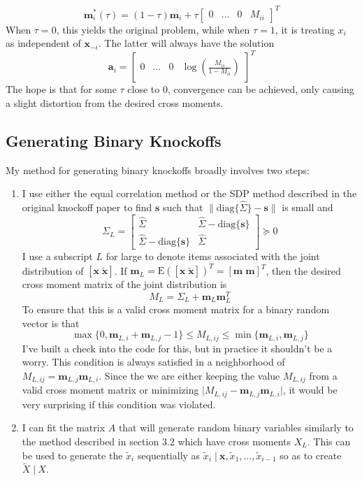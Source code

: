 \documentclass[11pt]{article}
\newcommand{\E}{\mathrm{E}}
\newcommand{\diag}[1]{\mathrm{diag}\{#1\}}
\newcommand{\st}{ \; \big | \:}
\theoremstyle{definition}
\begin{document}
\begin{enumerate}
    \[\mathbf m_i^*(\tau) = (1-\tau)\mathbf m_i + \tau \left[ \begin{array}{cccc} 0 & \ldots & 0 & M_{ii} \end{array} \right]^T \]
            When $\tau=0$, this yields the original problem, while when $\tau=1$, it is treating $x_i$ as independent of $\mathbf x_{-i}$. The latter will always have the solution
            \[\mathbf a_i = \left[ \begin{array}{cccc} 0 & \ldots & 0 & \log\left(\frac{M_{ii}}{1-M_{ii}}\right) \end{array} \right]^T \]
            The hope is that for some $\tau$ close to $0$, convergence can be achieved, only causing a slight distortion from the desired cross moments.
    \end{enumerate}

\subsection{Generating Binary Knockoffs}
    My method for generating binary knockoffs broadly involves two steps:
    \begin{enumerate}
        \item I use either the equal correlation method or the SDP method described in the original knockoff paper to find $\mathbf s$ such that $\|\diag{\hat\Sigma}-\mathbf s\|$ is small and 
        \[ \Sigma_L = \left[\begin{array}{cc}  \hat\Sigma & \hat\Sigma - \diag{\mathbf s }\\ \hat\Sigma - \diag{\mathbf s} & \hat\Sigma \end{array}\right] \succeq 0 \]
        I use a subscript $L$ for large to denote items associated with the joint distribution of $[\mathbf x \; \mathbf{\tilde x}]$. If $\mathbf m_L = \E\left([\mathbf x \; \mathbf{\tilde x}]\right)^T = [\mathbf m \; \mathbf m]^T$, then the desired cross moment matrix of the joint distribution is 
        \[ M_L = \Sigma_L + \mathbf m_L\mathbf m_L^T\]
        To ensure that this is a valid cross moment matrix for a binary random vector is that 
        \[\max\{0,\mathbf m_{L,i} + \mathbf m_{L,j} -1\} \leq M_{L,ij} \leq \min\{\mathbf m_{L,i}, \mathbf m_{L,j}\} \]
        I've built a check into the code for this, but in practice it shouldn't be a worry. This condition is always satisfied in a neighborhood of $M_{L,ij} = \mathbf m_{L,j}\mathbf m_{L,i}$. Since the we are either keeping the value $M_{L,ij}$ from a valid cross moment matrix or minimizing $\vert M_{L,ij} - \mathbf m_{L,j}\mathbf m_{L,i}\vert$, it would be very surprising if this condition was violated.
        
        \item I can fit the matrix $A$ that will generate random binary variables similarly to the method described in section $3.2$ which have cross moments $X_L$. This can be used to generate the $\tilde x_i$ sequentially as $\tilde x_i \st \mathbf x,\tilde x_1,\ldots,\tilde x_{i-1}$ so as to create $\tilde X \st X$. 
    \end{enumerate}
\end{document}
